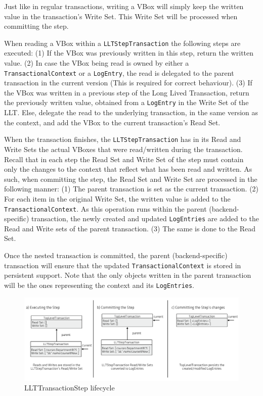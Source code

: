 \documentclass{llncs}
\begin{document}
Just like in regular transactions, writing a VBox will simply keep the
written value in the transaction's Write Set. This Write Set will be
processed when committing the step.

When reading a VBox within a \texttt{LLTStepTransaction} the following
steps are executed: (1) If the VBox was previously written in this
step, return the written value. (2) In case the VBox being read is
owned by either a \texttt{TransactionalContext} or a
\texttt{LogEntry}, the read is delegated to the parent transaction in
the current version (This is required for correct behaviour). (3) If
the VBox was written in a previous step of the Long Lived Transaction,
return the previously written value, obtained from a \texttt{LogEntry}
in the Write Set of the LLT.  Else, delegate the read to the
underlying transaction, in the same version as the context, and add
the VBox to the current transaction's Read Set.

When the transaction finishes, the \texttt{LLTStepTransaction} has in
its Read and Write Sets the actual VBoxes that were read/written
during the transaction. Recall that in each step the Read Set and
Write Set of the step must contain only the changes to the context
that reflect what has been read and written. As such, when committing
the step, the Read Set and Write Set are processed in the following
manner: (1) The parent transaction is set as the current
transaction. (2) For each item in the original Write Set, the written
value is added to the \texttt{TransactionalContext}. As this operation
runs within the parent (backend-specific) transaction, the newly
created and updated \texttt{LogEntries} are added to the Read and
Write sets of the parent transaction. (3) The same is done to the Read Set.

Once the nested transaction is committed, the parent
(backend-specific) transaction will ensure that the updated
\texttt{TransactionalContext} is stored in persistent support. Note
that the only objects written in the parent transaction will be the
ones representing the context and its \texttt{LogEntries}.

\begin{figure}
\centering
\includegraphics[width=.9\linewidth]{llt-step-lifecycle}
\caption{LLTTransactionStep lifecycle}
\label{fig:llt-lifecycle}
\end{figure}
\end{document}
